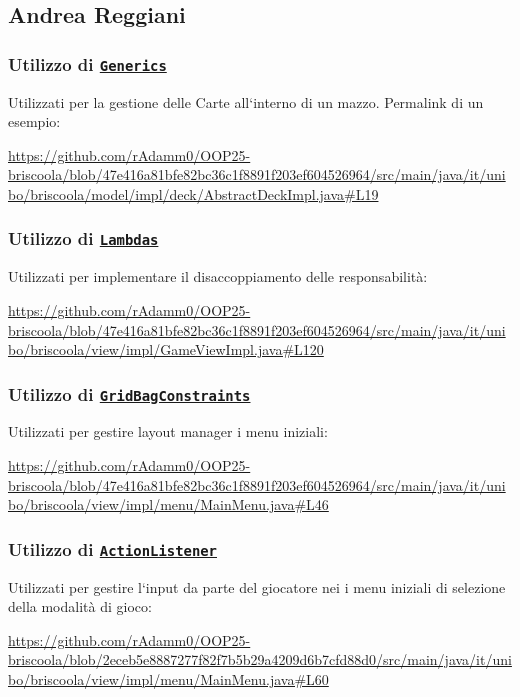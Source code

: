 \documentclass[a4paper,12pt]{report}
\begin{document}
\subsection{Andrea Reggiani}
\subsubsection{\textbf{Utilizzo di \href{https://docs.oracle.com/javase/tutorial/extra/generics/methods.html}{\texttt{Generics}}}}
Utilizzati per la gestione delle Carte all`interno di un mazzo. Permalink di un esempio:
\begin{sloppypar}
    \raggedright
    \url{https://github.com/rAdamm0/OOP25-briscoola/blob/47e416a81bfe82bc36c1f8891f203ef604526964/src/main/java/it/unibo/briscoola/model/impl/deck/AbstractDeckImpl.java#L19}
\end{sloppypar}


\subsubsection{\textbf{Utilizzo di \href{https://docs.oracle.com/javase/tutorial/java/javaOO/lambdaexpressions.html}{\texttt{Lambdas}}}}
Utilizzati per implementare il disaccoppiamento delle responsabilità:
\begin{sloppypar}
    \raggedright
    \url{https://github.com/rAdamm0/OOP25-briscoola/blob/47e416a81bfe82bc36c1f8891f203ef604526964/src/main/java/it/unibo/briscoola/view/impl/GameViewImpl.java#L120}
\end{sloppypar}


\subsubsection{\textbf{Utilizzo di \href{https://docs.oracle.com/javase/8/docs/api/java/awt/GridBagConstraints.html}{\texttt{GridBagConstraints}}}}
Utilizzati per gestire layout manager i menu iniziali:
\begin{sloppypar}
    \raggedright
    \url{https://github.com/rAdamm0/OOP25-briscoola/blob/47e416a81bfe82bc36c1f8891f203ef604526964/src/main/java/it/unibo/briscoola/view/impl/menu/MainMenu.java#L46}
\end{sloppypar}

\subsubsection{\textbf{Utilizzo di \href{https://docs.oracle.com/javase/8/docs/api/index.html?java/awt/event/ActionListener.html}{\texttt{ActionListener}}}}
Utilizzati per gestire l`input da parte del giocatore nei i menu iniziali di selezione della modalità di gioco:
\begin{sloppypar}
    \raggedright
    \url{https://github.com/rAdamm0/OOP25-briscoola/blob/2eceb5e8887277f82f7b5b29a4209d6b7cfd88d0/src/main/java/it/unibo/briscoola/view/impl/menu/MainMenu.java#L60}
\end{sloppypar}
\end{document}
